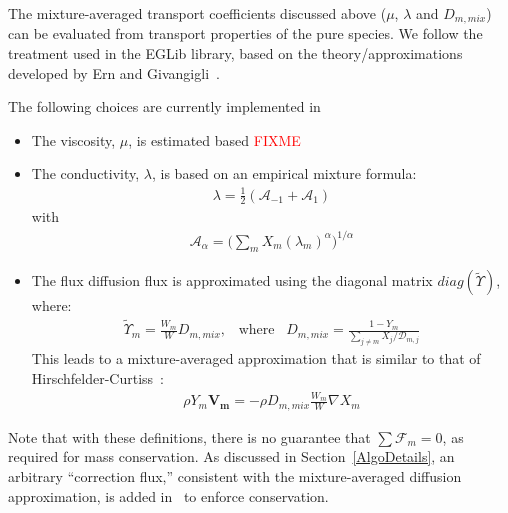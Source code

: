 The mixture-averaged transport coefficients discussed above ($\mu$, $\lambda$ and $D_{m,mix}$) can be evaluated from transport properties of the pure species. We follow the treatment used in the EGLib library, based on the theory/approximations developed by Ern and Givangigli~\cite{Ern:1994,Ern:2004}.

The following choices are currently implemented in \pelelm\ 
\begin{itemize}
\item The viscosity, $\mu$, is estimated based \textcolor{red}{FIXME}
\item The conductivity, $\lambda$, is based on an empirical mixture formula:
\begin{eqnarray}
\lambda = \frac{1}{2} (\mathcal{A}_{-1} + \mathcal{A}_{1})
\end{eqnarray}
with
\begin{eqnarray}
\mathcal{A}_{\alpha}= \Big( \sum_m X_m (\lambda_m)^{\alpha} \Big)^{1/\alpha}
\end{eqnarray}
\item The flux diffusion flux is approximated using the diagonal matrix $diag(\widetilde{ \Upsilon})$, where:
\begin{eqnarray}
\widetilde{ \Upsilon}_m = \frac{W_m}{W} D_{m,mix}, \;\;\;\mbox{where} \;\;\; D_{m,mix} = \frac{1-Y_m}{ \sum_{j \neq m} X_j / \mathcal{D}_{m,j}}
\label{eq:dmix}
\end{eqnarray}
This leads to a mixture-averaged approximation that is similar to that of Hirschfelder-Curtiss~\cite{Hirschfelder:1954}:
\begin{eqnarray*}
\rho Y_m \boldsymbol{V_m} = - \rho D_{m,mix} \frac{W_m}{W} \nabla X_m 
\end{eqnarray*}
\end{itemize}
Note that with these definitions, there is no guarantee that $\sum \boldsymbol{\mathcal{F}}_{m} = 0$, as
required for mass conservation. As discussed in Section~\ref{AlgoDetails}, an arbitrary ``correction flux,'' consistent with the mixture-averaged diffusion approximation, is added in \pelelm\ to enforce conservation.


